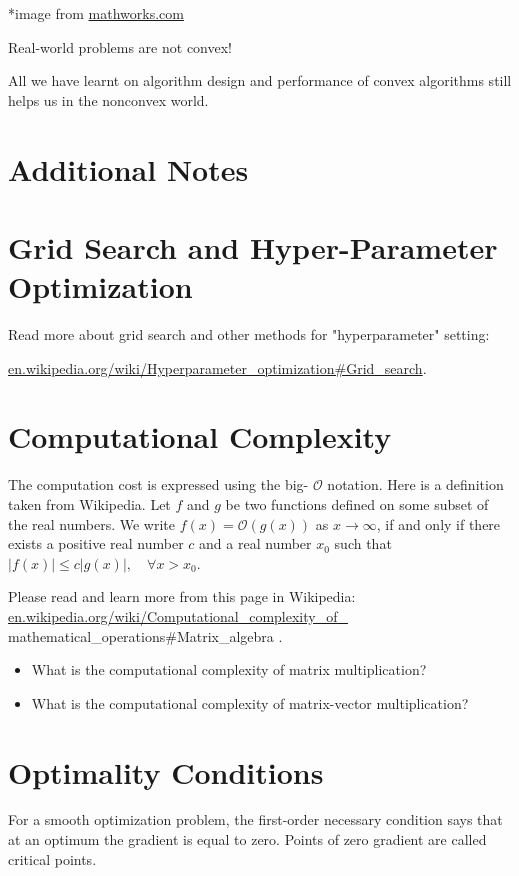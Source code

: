 \documentclass[10pt]{article}
\begin{document}
*image from \href{http://mathworks.com}{mathworks.com}

Real-world problems are not convex!

All we have learnt on algorithm design and performance of convex algorithms still helps us in the nonconvex world.

\section*{Additional Notes}
\section*{Grid Search and Hyper-Parameter Optimization}
Read more about grid search and other methods for "hyperparameter" setting:

\href{http://en.wikipedia.org/wiki/Hyperparameter_optimization#Grid_search}{en.wikipedia.org/wiki/Hyperparameter\_optimization\#Grid\_search}.

\section*{Computational Complexity}
The computation cost is expressed using the big- $\mathcal{O}$ notation. Here is a definition taken from Wikipedia. Let $f$ and $g$ be two functions defined on some subset of the real numbers. We write $f(x)=\mathcal{O}(g(x))$ as $x \rightarrow \infty$, if and only if there exists a positive real number $c$ and a real number $x_{0}$ such that $|f(x)| \leq c|g(x)|, \quad \forall x>x_{0}$.

Please read and learn more from this page in Wikipedia: \href{http://en.wikipedia.org/wiki/Computational_complexity_of_}{en.wikipedia.org/wiki/Computational\_complexity\_of\_} mathematical\_operations\#Matrix\_algebra .

\begin{itemize}
  \item What is the computational complexity of matrix multiplication?
  \item What is the computational complexity of matrix-vector multiplication?
\end{itemize}

\section*{Optimality Conditions}
For a smooth optimization problem, the first-order necessary condition says that at an optimum the gradient is equal to zero. Points of zero gradient are called critical points.
\end{document}
